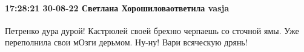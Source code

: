  
 
 
 
 

\paragraph{17:28:21 30-08-22 Светлана Хорошиловаответила vasja}

Петренко дура дурой! Кастрюлей своей брехню черпаешь со сточной ямы. Уже
переполнила свои мОзги дерьмом. Ну-ну! Вари всяческую дрянь!
